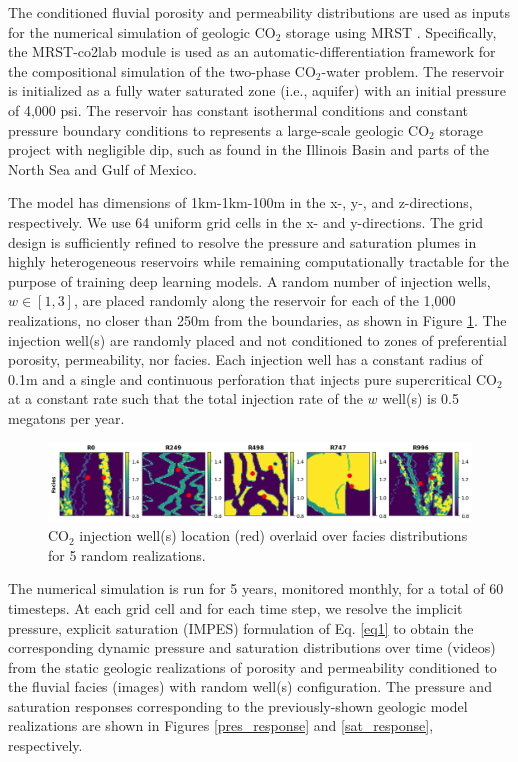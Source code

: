 \documentclass[10pt, twoside]{article}
\begin{document}
The conditioned fluvial porosity and permeability distributions are used as inputs for the numerical simulation of geologic CO$_2$ storage using MRST \cite{MRST2019}. Specifically, the MRST-co2lab module is used as an automatic-differentiation framework for the compositional simulation of the two-phase CO$_2$-water problem. The reservoir is initialized as a fully water saturated zone (i.e., aquifer) with an initial pressure of 4,000 psi. The reservoir has constant isothermal conditions and constant pressure boundary conditions to represents a large-scale geologic CO$_2$ storage project with negligible dip, such as found in the Illinois Basin and parts of the North Sea and Gulf of Mexico. 

The model has dimensions of 1km-1km-100m in the x-, y-, and z-directions, respectively. We use 64 uniform grid cells in the x- and y-directions. The grid design is sufficiently refined to resolve the pressure and saturation plumes in highly heterogeneous reservoirs while remaining computationally tractable for the purpose of training deep learning models. A random number of injection wells, $w \in [1,3]$, are placed randomly along the reservoir for each of the 1,000 realizations, no closer than 250m from the boundaries, as shown in Figure \ref{wells_dist}. The injection well(s) are randomly placed and not conditioned to zones of preferential porosity, permeability, nor facies. Each injection well has a constant radius of 0.1m and a single and continuous perforation that injects pure supercritical CO$_2$ at a constant rate such that the total injection rate of the $w$ well(s) is 0.5 megatons per year.

\begin{figure}[t]
    \centering
    \includegraphics[width=16cm]{figures/wells_dist.png}
    \caption{CO$_2$ injection well(s) location (red) overlaid over facies distributions for 5 random realizations.}
    \label{wells_dist}
\end{figure}

The numerical simulation is run for 5 years, monitored monthly, for a total of 60 timesteps. At each grid cell and for each time step, we resolve the implicit pressure, explicit saturation (IMPES) formulation of Eq. \eqref{eq1} to obtain the corresponding dynamic pressure and saturation distributions over time (videos) from the static geologic realizations of porosity and permeability conditioned to the fluvial facies (images) with random well(s) configuration. The pressure and saturation responses corresponding to the previously-shown geologic model realizations are shown in Figures \ref{pres_response} and \ref{sat_response}, respectively.
\end{document}
